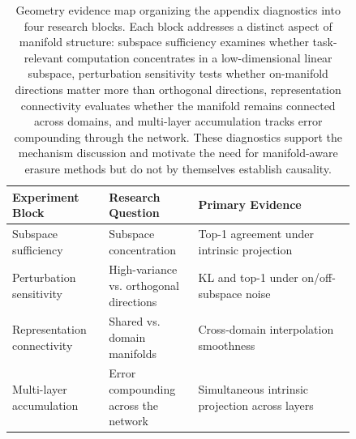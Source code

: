 \begin{table}[t]
\centering
\caption{Geometry evidence map organizing the appendix diagnostics into four research blocks. Each block addresses a distinct aspect of manifold structure: subspace sufficiency examines whether task-relevant computation concentrates in a low-dimensional linear subspace, perturbation sensitivity tests whether on-manifold directions matter more than orthogonal directions, representation connectivity evaluates whether the manifold remains connected across domains, and multi-layer accumulation tracks error compounding through the network. These diagnostics support the mechanism discussion and motivate the need for manifold-aware erasure methods but do not by themselves establish causality.}
\label{tab:geometry_schedule}
\scriptsize
\begin{tabular}{p{0.22\linewidth}p{0.22\linewidth}p{0.40\linewidth}}
\toprule
Experiment Block & Research Question & Primary Evidence \\
\midrule
Subspace sufficiency & Subspace concentration & Top-1 agreement under intrinsic projection \\
Perturbation sensitivity & High-variance vs. orthogonal directions & KL and top-1 under on/off-subspace noise \\
Representation connectivity & Shared vs. domain manifolds & Cross-domain interpolation smoothness \\
Multi-layer accumulation & Error compounding across the network & Simultaneous intrinsic projection across layers \\
\bottomrule
\end{tabular}
\end{table}
